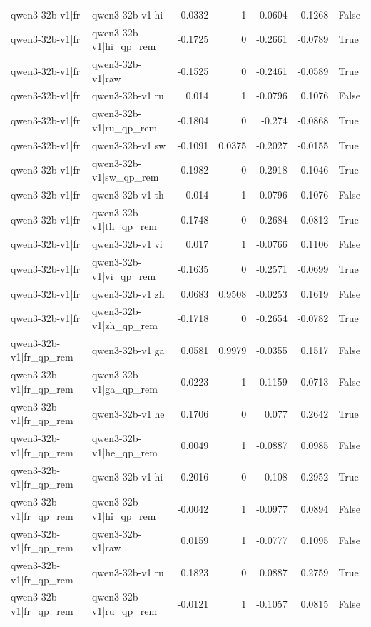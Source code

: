 \begin{table}
\begin{tabular}{l l r r r r l}
qwen3-32b-v1|fr & qwen3-32b-v1|hi & 0.0332 & 1 & -0.0604 & 0.1268 & False \\
qwen3-32b-v1|fr & qwen3-32b-v1|hi_qp_rem & -0.1725 & 0 & -0.2661 & -0.0789 & True \\
qwen3-32b-v1|fr & qwen3-32b-v1|raw & -0.1525 & 0 & -0.2461 & -0.0589 & True \\
qwen3-32b-v1|fr & qwen3-32b-v1|ru & 0.014 & 1 & -0.0796 & 0.1076 & False \\
qwen3-32b-v1|fr & qwen3-32b-v1|ru_qp_rem & -0.1804 & 0 & -0.274 & -0.0868 & True \\
qwen3-32b-v1|fr & qwen3-32b-v1|sw & -0.1091 & 0.0375 & -0.2027 & -0.0155 & True \\
qwen3-32b-v1|fr & qwen3-32b-v1|sw_qp_rem & -0.1982 & 0 & -0.2918 & -0.1046 & True \\
qwen3-32b-v1|fr & qwen3-32b-v1|th & 0.014 & 1 & -0.0796 & 0.1076 & False \\
qwen3-32b-v1|fr & qwen3-32b-v1|th_qp_rem & -0.1748 & 0 & -0.2684 & -0.0812 & True \\
qwen3-32b-v1|fr & qwen3-32b-v1|vi & 0.017 & 1 & -0.0766 & 0.1106 & False \\
qwen3-32b-v1|fr & qwen3-32b-v1|vi_qp_rem & -0.1635 & 0 & -0.2571 & -0.0699 & True \\
qwen3-32b-v1|fr & qwen3-32b-v1|zh & 0.0683 & 0.9508 & -0.0253 & 0.1619 & False \\
qwen3-32b-v1|fr & qwen3-32b-v1|zh_qp_rem & -0.1718 & 0 & -0.2654 & -0.0782 & True \\
qwen3-32b-v1|fr_qp_rem & qwen3-32b-v1|ga & 0.0581 & 0.9979 & -0.0355 & 0.1517 & False \\
qwen3-32b-v1|fr_qp_rem & qwen3-32b-v1|ga_qp_rem & -0.0223 & 1 & -0.1159 & 0.0713 & False \\
qwen3-32b-v1|fr_qp_rem & qwen3-32b-v1|he & 0.1706 & 0 & 0.077 & 0.2642 & True \\
qwen3-32b-v1|fr_qp_rem & qwen3-32b-v1|he_qp_rem & 0.0049 & 1 & -0.0887 & 0.0985 & False \\
qwen3-32b-v1|fr_qp_rem & qwen3-32b-v1|hi & 0.2016 & 0 & 0.108 & 0.2952 & True \\
qwen3-32b-v1|fr_qp_rem & qwen3-32b-v1|hi_qp_rem & -0.0042 & 1 & -0.0977 & 0.0894 & False \\
qwen3-32b-v1|fr_qp_rem & qwen3-32b-v1|raw & 0.0159 & 1 & -0.0777 & 0.1095 & False \\
qwen3-32b-v1|fr_qp_rem & qwen3-32b-v1|ru & 0.1823 & 0 & 0.0887 & 0.2759 & True \\
qwen3-32b-v1|fr_qp_rem & qwen3-32b-v1|ru_qp_rem & -0.0121 & 1 & -0.1057 & 0.0815 & False \\

\end{tabular}
\end{table}
